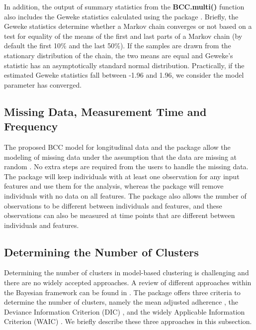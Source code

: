In addition, the output of summary statistics from the \textbf{BCC.multi()} function also includes the Geweke statistics calculated using the  package \citep{Martyn2006}. Briefly, the Geweke statistics determine whether a Markov chain converges or not based on a test for equality of the means of the first and last parts of a Markov chain (by default the first 10\% and the last 50\%). If the samples are drawn from the stationary distribution of the chain, the two means are equal and Geweke's statistic has an asymptotically standard normal distribution. Practically, if the estimated Geweke statistics fall between -1.96 and 1.96, we consider the model parameter has converged. 

\subsection{Missing Data, Measurement Time and Frequency}

The proposed BCC model for longitudinal data and the  package allow the modeling of missing data under the assumption that the data are missing at random \citep{Lu2022, Tan2022a}. No extra steps are required from the users to handle the missing data. The package will keep individuals with at least one observation for any input features and use them for the analysis, whereas the package will remove individuals with no data on all features. The package also allows the number of observations to be different between individuals and features, and these observations can also be measured at time points that are different between individuals and features.

\subsection{Determining the Number of Clusters}

Determining the number of clusters in model-based clustering is challenging and there are no widely accepted approaches. A review of different approaches within the Bayesian framework can be found in \citet{Celeux2006, Nasserinejad2017,Merkle2019}. The  package offers three criteria to determine the number of clusters, namely the mean adjusted adherence \citep{Lock2013}, the Deviance Information Criterion (DIC) \citep{Spiegelhalter2002, Celeux2006}, and the widely Applicable Information Criterion (WAIC) \citep{Watanabe2010, Gelman2014a}. We briefly describe these three approaches in this subsection. 

